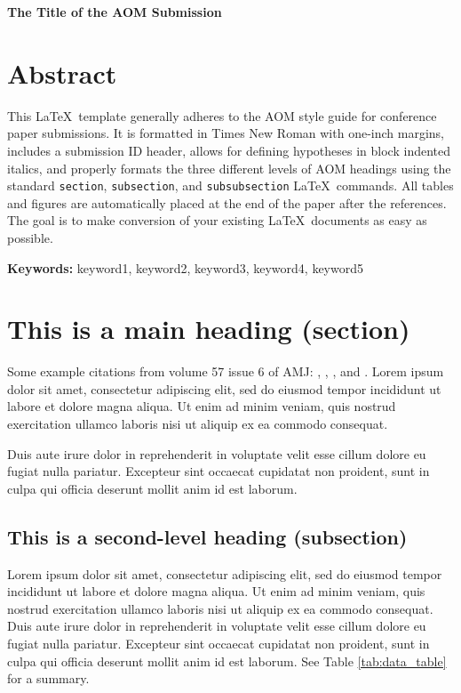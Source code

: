 \documentclass[12pt,letterpaper]{article}
\renewcommand{\title}[1]{
  	\centerline{\textbf{#1}}
  }
\begin{document}
\title{The Title of the AOM Submission}

\section{Abstract}
This \LaTeX\ template generally adheres to the AOM style guide for conference paper submissions. It is formatted in Times New Roman with one-inch margins, includes a submission ID header, allows for defining hypotheses in block indented italics, and properly formats the three different levels of AOM headings using the standard \texttt{section},  \texttt{subsection}, and  \texttt{subsubsection} \LaTeX\ commands. All tables and figures are automatically placed at the end of the paper after the references. The goal is to make conversion of your existing \LaTeX\ documents as easy as possible.

\noindent\textbf{Keywords:} keyword1, keyword2, keyword3, keyword4, keyword5
\newpage

\section{This is a main heading (section)}
  
Some example citations from volume 57 issue 6 of AMJ:  \citet{9984685620141201}, \citet{9984686620141201}, \citet{9984686520141201}, and \citet{9984685820141201}. Lorem ipsum dolor sit amet, consectetur adipiscing elit, sed do eiusmod tempor incididunt ut labore et dolore magna aliqua. Ut enim ad minim veniam, quis nostrud exercitation ullamco laboris nisi ut aliquip ex ea commodo consequat.

Duis aute irure dolor in reprehenderit in voluptate velit esse cillum dolore eu fugiat nulla pariatur. Excepteur sint occaecat cupidatat non proident, sunt in culpa qui officia deserunt mollit anim id est laborum.

\subsection{This is a second-level heading (subsection)}

Lorem ipsum dolor sit amet, consectetur adipiscing elit, sed do eiusmod tempor incididunt ut labore et dolore magna aliqua. Ut enim ad minim veniam, quis nostrud exercitation ullamco laboris nisi ut aliquip ex ea commodo consequat. Duis aute irure dolor in reprehenderit in voluptate velit esse cillum dolore eu fugiat nulla pariatur. Excepteur sint occaecat cupidatat non proident, sunt in culpa qui officia deserunt mollit anim id est laborum. See Table \ref{tab:data_table} for a summary.
\end{document}
